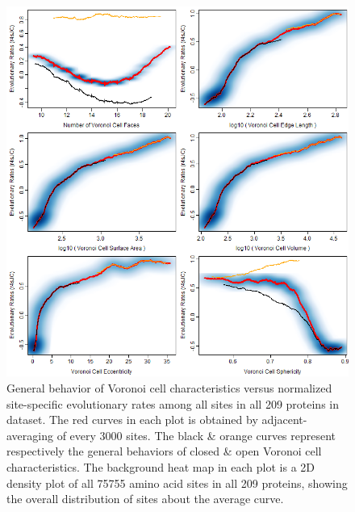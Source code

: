 \documentclass[11pt]{article}
\begin{document}
    \begin{figure}
        \begin{center}
        \includegraphics[width=5.5in]{adjacent_averaging_screen/only_voro/zr4s_JC_voro.png}
        \end{center}
        \caption{General behavior of Voronoi cell characteristics versus normalized site-specific evolutionary rates among all sites in all 209 proteins in dataset. The red curves in each plot is obtained by adjacent-averaging of every $3000$ sites. The black \& orange curves represent respectively the general behaviors of closed \& open Voronoi cell characteristics. The background heat map in each plot is a 2D density plot of all 75755 amino acid sites in all 209 proteins, showing the overall distribution of sites about the average curve.}
        \label{fig:zr4s_JC_voro}
    \end{figure}
\end{document}
